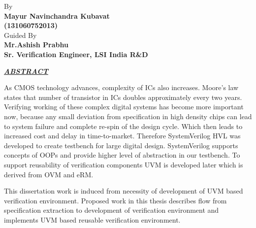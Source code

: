 \thispagestyle{plain}

\begin{center}
	\vspace{1cm}
		
		
	\vspace{1.5cm}
		
			\normalsize
			By\\
			\textbf{Mayur Navinchandra Kubavat}\\
			\textbf{(131060752013)} \\
			Guided By\\
			\textbf{Mr.Ashish Prabhu}\\
			\textbf{Sr. Verification Engineer, LSI India R\&D}
			
	\bigsize\textbf\textit\underline{ABSTRACT}
\end{center}

As CMOS technology advances, complexity of ICs also increases. Moore’s law states that number of transistor in ICs doubles approximately every two years. Verifying working of these complex digital systems has become more important now, because any small deviation from specification in high density chips can lead to system failure and complete re-spin of the design cycle. Which then leads to increased cost and delay in time-to-market. Therefore SystemVerilog HVL was developed to create testbench for large digital design. SystemVerilog supports concepts of OOPs and provide higher level of abstraction in our testbench. To support reusability of verification components UVM is developed later which is derived from OVM and eRM. \par

This dissertation work is induced from necessity of development of UVM based verification environment. Proposed work in this thesis describes flow from specification extraction to development of verification environment and implements UVM based reusable verification environment. \par